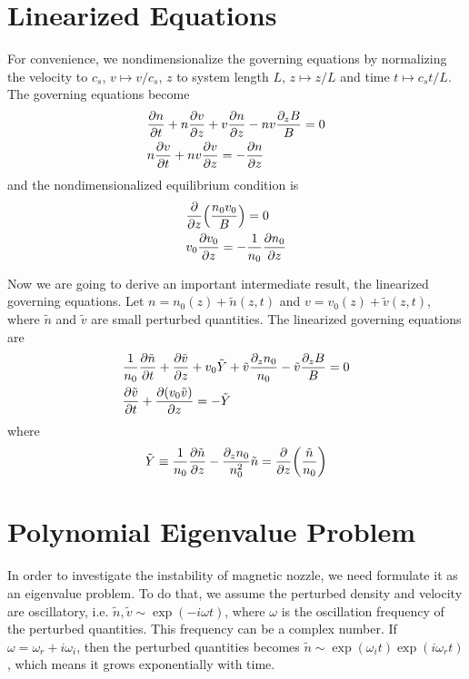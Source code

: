 \section{Linearized Equations}
For convenience, we nondimensionalize the governing equations by normalizing the velocity to $c_s$, $v\mapsto v/c_s$, $z$ to system length $L$, $z \mapsto z/L$ and time $t\mapsto c_s t/L$. The governing equations become
\begin{align}
    &\pdv{n}{t} + n\pdv{v}{z} + v\pdv{n}{z} - nv\frac{\partial_z B}{B} = 0 \\
    &n\pdv{v}{t} + nv\pdv{v}{z} = -\pdv{n}{z}
\end{align}
and the nondimensionalized equilibrium condition is
\begin{align}
    &\pdv{z}(\frac{n_0v_0}{B}) = 0 \label{eq:equilibrium-convervation-of-density}\\
    &v_0\pdv{v_0}{z} = -\frac{1}{n_0}\pdv{n_0}{z} \label{eq:equilibrium-convervation-of-momentum}
\end{align}

Now we are going to derive an important intermediate result, the linearized governing equations.
    Let $n = n_0(z) + \tilde{n}(z,t)$ and $v = v_0(z) + \tilde{v}(z,t)$, where $\tilde{n}$ and $\tilde{v}$ are small perturbed quantities. The linearized governing equations are
  \begin{align}
      &\frac{1}{n_0}\pdv{\tilde{n}}{t} 
      + \pdv{\tilde{v}}{z} + v_0\tilde{Y} + \tilde{v}\frac{\partial_z n_0}{n_0} - \tilde{v}\frac{\partial_z B}{B} = 0 
      \label{eq:linearized-conservation-of-density}
      \\
      &\pdv{\tilde{v}}{t} + \pdv{(v_0\tilde{v})}{z} = -\tilde{Y}
      \label{eq:linearized-conservation-of-momentum}
  \end{align}
  where 
  \[ \tilde{Y} \equiv \frac{1}{n_0}\pdv{\tilde{n}}{z} - \frac{\partial_z n_0}{n_0^2}\tilde{n} = \pdv{z}(\frac{\tilde{n}}{n_0}) \]

\section{Polynomial Eigenvalue Problem}
In order to investigate the instability of magnetic nozzle, we need formulate it as an eigenvalue problem. To do that, we assume the perturbed density and velocity are oscillatory, i.e. $\tilde{n}, \tilde{v} \sim \exp(-i\omega t)$, where $\omega$ is the oscillation frequency of the perturbed quantities. This frequency can be a complex number. If $\omega = \omega_r +i \omega_i$, then the perturbed quantities becomes $\tilde{n} \sim \exp(\omega_i t)\exp(i\omega_r t)$, which means it grows exponentially with time.

